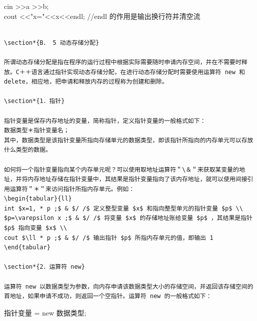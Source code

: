 \documentclass[10pt]{article}
\begin{document}
cin >>a >>b;\\
cout <<"x="<<x<<endl; //endl 的作用是输出换行符并清空流

\begin{verbatim}

\section*{B． 5 动态存储分配}

所谓动态存储分配是指在程序的运行过程中根据实际需要随时申请内存空间，并在不需要时释放。C＋＋语言通过指针实现动态存储分配，在进行动态存储分配时需要使用运算符 new 和 delete，相应地，把申请和释放内存的过程称为创建和删除。

\section*{1．指针}

指针变量是保存内存地址的变量，简称指针，定义指针变量的一般格式如下：
数据类型＊指针变量名；
其中，数据类型是该指针变量所指向存储单元的数据类型，即该指针所指向的内存单元可以存放什么类型的数据。

如何将一个指针变量指向某个内存单元呢？可以使用取地址运算符＂\＆＂来获取某变量的地址，并将内存地址存储在指针变量中，其结果是指针变量指向了该内存地址，就可以使用间接引用运算符＂＊＂来访问指针所指内存单元。例如：
\begin{tabular}{ll} 
int $x=1, * p ;$ & $/ /$ 定义整型变量 $x$ 和指向整型单元的指针变量 $p$ \\
$p=\varepsilon x ;$ & $/ /$ 将变量 $x$ 的存储地址账给变量 $p$ ，其结果是指针 $p$ 指向变量 $x$ \\
cout $\ll * p ;$ & $/ /$ 输出指针 $p$ 所指内存单元的值，即输出 1
\end{tabular}

\section*{2．运算符 new}

运算符 new 以数据类型为参数，向内存申请该数据类型大小的存储空间，并返回该存储空间的首地址，如果申请不成功，则返回一个空指针。运算符 new 的一般格式如下：
\end{verbatim}

指针变量 = new 数据类型;
\end{document}
